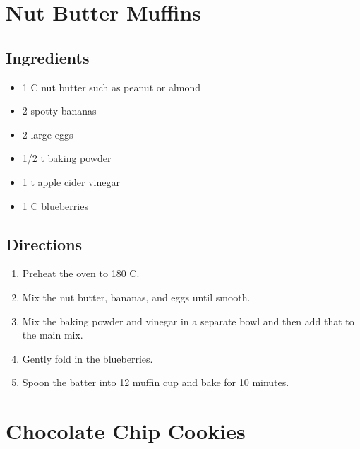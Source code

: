 \documentclass[letterpaper,10pt,english]{sphinxmanual}
\begin{document}
\chapter{Nut Butter Muffins}
\label{nut_butter_muffins::doc}\label{nut_butter_muffins:nut-butter-muffins}

\section{Ingredients}
\label{nut_butter_muffins:ingredients}\begin{itemize}
\item {} 
1   C   nut butter such as peanut or almond

\item {} 
2       spotty bananas

\item {} 
2       large eggs

\item {} 
1/2 t   baking powder

\item {} 
1   t   apple cider vinegar

\item {} 
1   C   blueberries

\end{itemize}


\section{Directions}
\label{nut_butter_muffins:directions}\begin{enumerate}
\item {} 
Preheat the oven to 180 C.

\item {} 
Mix the nut butter, bananas, and eggs until smooth.

\item {} 
Mix the baking powder and vinegar in a separate bowl and then add that to the main mix.

\item {} 
Gently fold in the blueberries.

\item {} 
Spoon the batter into 12 muffin cup and bake for 10 minutes.

\end{enumerate}


\chapter{Chocolate Chip Cookies}
\label{chocolate_chip_cookies:chocolate-chip-cookies}\label{chocolate_chip_cookies::doc}
\end{document}
